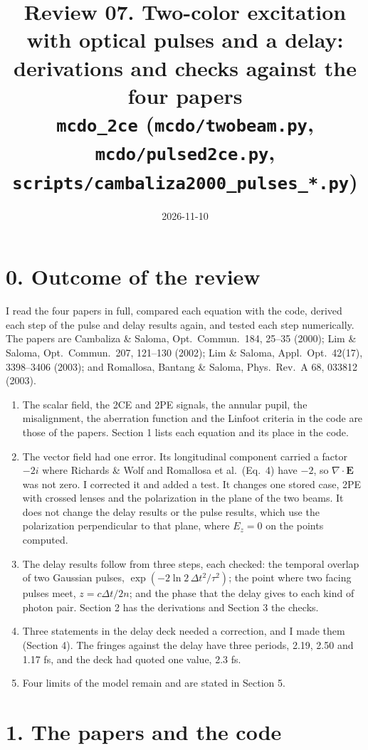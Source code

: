 \documentclass[10pt]{article}
\title{\vspace{-1.2cm}\textbf{Review 07. Two-color excitation with optical pulses and a delay:\\ derivations and checks against the four papers}\\
\large \texttt{mcdo\_2ce} \quad(\texttt{mcdo/twobeam.py}, \texttt{mcdo/pulsed2ce.py},
\texttt{scripts/cambaliza2000\_pulses\_*.py})}
\author{}\date{2026-11-10}
\begin{document}
\maketitle\vspace{-1.0cm}

\section*{0. Outcome of the review}
I read the four papers in full, compared each equation with the code, derived each step of the pulse and delay
results again, and tested each step numerically. The papers are Cambaliza \& Saloma, Opt.\ Commun.\ 184, 25--35 (2000);
Lim \& Saloma, Opt.\ Commun.\ 207, 121--130 (2002); Lim \& Saloma, Appl.\ Opt.\ 42(17), 3398--3406 (2003); and
Romallosa, Bantang \& Saloma, Phys.\ Rev.\ A 68, 033812 (2003).
\begin{enumerate}
\item The scalar field, the 2CE and 2PE signals, the annular pupil, the misalignment, the aberration function and the
Linfoot criteria in the code are those of the papers. Section 1 lists each equation and its place in the code.
\item The vector field had one error. Its longitudinal component carried a factor $-2i$ where Richards \& Wolf and
Romallosa et al.\ (Eq.~4) have $-2$, so $\nabla\cdot\mathbf{E}$ was not zero. I corrected it and added a test.
It changes one stored case, 2PE with crossed lenses and the polarization in the plane of the two beams. It does not
change the delay results or the pulse results, which use the polarization perpendicular to that plane, where
$E_z = 0$ on the points computed.
\item The delay results follow from three steps, each checked: the temporal overlap of two Gaussian pulses,
$\exp(-2\ln 2\,\Delta t^2/\tau^2)$; the point where two facing pulses meet, $z = c\Delta t/2n$; and the phase
that the delay gives to each kind of photon pair. Section 2 has the derivations and Section 3 the checks.
\item Three statements in the delay deck needed a correction, and I made them (Section 4). The fringes against the
delay have three periods, 2.19, 2.50 and 1.17 fs, and the deck had quoted one value, 2.3 fs.
\item Four limits of the model remain and are stated in Section 5.
\end{enumerate}

\section*{1. The papers and the code}
\end{document}
